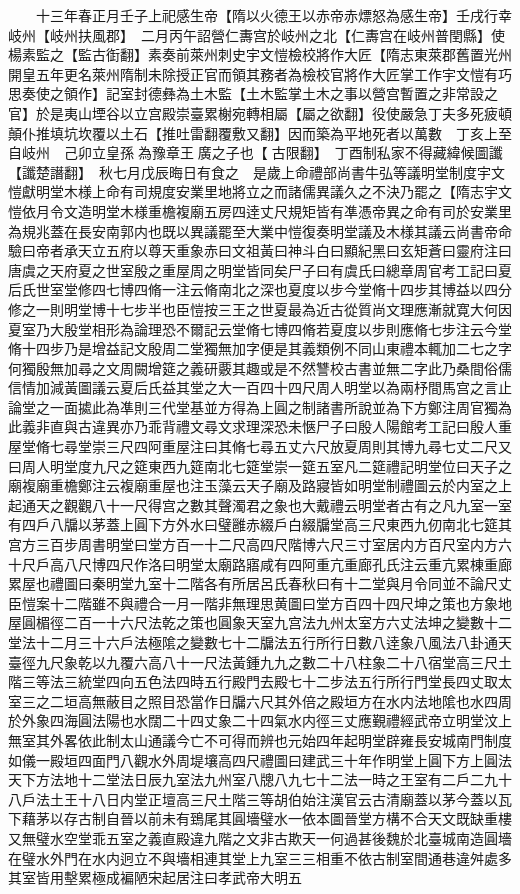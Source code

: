 　　十三年春正月壬子上祀感生帝【隋以火德王以赤帝赤熛怒為感生帝】壬戌行幸岐州【岐州扶風郡】　二月丙午詔營仁夀宫於岐州之北【仁夀宫在岐州普閏縣】使楊素監之【監古衘翻】素奏前萊州刺史宇文愷檢校將作大匠【隋志東萊郡舊置光州開皇五年更名萊州隋制未除授正官而領其務者為檢校官將作大匠掌工作宇文愷有巧思奏使之領作】記室封德彝為土木監【土木監掌土木之事以營宫暫置之非常設之官】於是夷山堙谷以立宫殿崇臺累榭宛轉相屬【屬之欲翻】役使嚴急丁夫多死疲頓顛仆推填坑坎覆以土石【推吐雷翻覆敷又翻】因而築為平地死者以萬數　丁亥上至自岐州　己卯立皇孫為豫章王廣之子也【古限翻】　丁酉制私家不得藏緯候圖讖【讖楚譖翻】　秋七月戊辰晦日有食之　是歲上命禮部尚書牛弘等議明堂制度宇文愷獻明堂木様上命有司規度安業里地將立之而諸儒異議久之不決乃罷之【隋志宇文愷依月令文造明堂木様重檐複廟五房四逹丈尺規矩皆有凖憑帝異之命有司於安業里為規兆蓋在長安南郭内也既以異議罷至大業中愷復奏明堂議及木様其議云尚書帝命驗曰帝者承天立五府以尊天重象赤曰文祖黃曰神斗白曰顯紀黑曰玄矩蒼曰靈府注曰唐虞之天府夏之世室殷之重屋周之明堂皆同矣尸子曰有虞氏曰總章周官考工記曰夏后氏世室堂修四七博四脩一注云脩南北之深也夏度以步今堂脩十四步其博益以四分修之一則明堂博十七步半也臣愷按三王之世夏最為近古從質尚文理應漸就寛大何因夏室乃大殷堂相形為論理恐不爾記云堂脩七博四脩若夏度以步則應脩七步注云今堂脩十四步乃是增益記文殷周二堂獨無加字便是其義類例不同山東禮本輒加二七之字何獨殷無加尋之文周闕增筵之義研覈其趣或是不然讐校古書並無二字此乃桑間俗儒信情加減黃圖議云夏后氏益其堂之大一百四十四尺周人明堂以為兩杼間馬宫之言止論堂之一面㨿此為凖則三代堂基並方得為上圓之制諸書所說並為下方鄭注周官獨為此義非直與古違異亦乃乖背禮文尋文求理深恐未愜尸子曰殷人陽館考工記曰殷人重屋堂脩七尋堂崇三尺四阿重屋注曰其脩七尋五丈六尺放夏周則其博九尋七丈二尺又曰周人明堂度九尺之筵東西九筵南北七筵堂崇一筵五室凡二筵禮記明堂位曰天子之廟複廟重檐鄭注云複廟重屋也注玉藻云天子廟及路寢皆如明堂制禮圖云於内室之上起通天之觀觀八十一尺得宫之數其聲濁君之象也大戴禮云明堂者古有之凡九室一室有四戶八牖以茅蓋上圓下方外水曰璧雝赤綴戶白綴牖堂高三尺東西九仞南北七筵其宫方三百步周書明堂曰堂方百一十二尺高四尺階博六尺三寸室居内方百尺室内方六十尺戶高八尺博四尺作洛曰明堂太廟路寤咸有四阿重亢重廊孔氏注云重亢累棟重廊累屋也禮圖曰秦明堂九室十二階各有所居呂氏春秋曰有十二堂與月令同並不論尺丈臣愷案十二階雖不與禮合一月一階非無理思黄圖曰堂方百四十四尺坤之策也方象地屋圓楣徑二百一十六尺法乾之策也圓象天室九宫法九州太室方六丈法坤之變數十二堂法十二月三十六戶法極隂之變數七十二牖法五行所行日數八逹象八風法八卦通天臺徑九尺象乾以九覆六高八十一尺法黃鍾九九之數二十八柱象二十八宿堂高三尺土階三等法三統堂四向五色法四時五行殿門去殿七十二步法五行所行門堂長四丈取太室三之二垣高無蔽目之照目恐當作日牖六尺其外倍之殿垣方在水内法地隂也水四周於外象四海圓法陽也水闊二十四丈象二十四氣水内徑三丈應覲禮經武帝立明堂汶上無室其外畧依此制太山通議今亡不可得而辨也元始四年起明堂辟雍長安城南門制度如儀一殿垣四面門八觀水外周堤壤高四尺禮圖曰建武三十年作明堂上圓下方上圓法天下方法地十二堂法日辰九室法九州室八牕八九七十二法一時之王室有二戶二九十八戶法土王十八日内堂正壇高三尺土階三等胡伯始注漢官云古清廟蓋以茅今蓋以瓦下藉茅以存古制自晉以前未有鵄尾其圓墻璧水一依本圖晉堂方構不合天文既缺重樓又無璧水空堂乖五室之義直殿違九階之文非古欺天一何過甚後魏於北臺城南造圓墻在璧水外門在水内迥立不與墻相連其堂上九室三三相重不依古制室間通巷違舛處多其室皆用墼累極成褊陋宋起居注曰孝武帝大明五